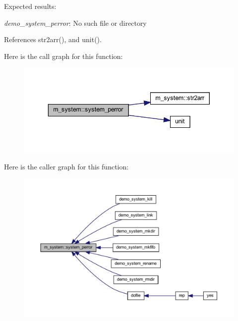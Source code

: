Expected results\+:

{\itshape demo\+\_\+system\+\_\+perror}\+: No such file or directory 

References str2arr(), and unit().

Here is the call graph for this function\+:
\nopagebreak
\begin{figure}[H]
\begin{center}
\leavevmode
\includegraphics[width=343pt]{namespacem__system_afae451a1fc5432274dc1f75a364051b4_cgraph}
\end{center}
\end{figure}
Here is the caller graph for this function\+:
\nopagebreak
\begin{figure}[H]
\begin{center}
\leavevmode
\includegraphics[width=350pt]{namespacem__system_afae451a1fc5432274dc1f75a364051b4_icgraph}
\end{center}
\end{figure}
\mbox{\label{namespacem__system_af0c9df8e59cac9cd617cd1e20448ea7d}} 
